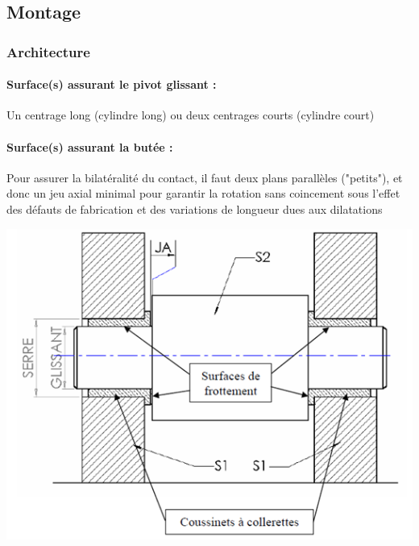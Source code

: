 \documentclass[11pt,oneside]{article}
\begin{document}

\subsection{Montage}
\subsubsection{Architecture}
\paragraph*{Surface(s) assurant le pivot glissant :}
Un centrage long (cylindre long) ou deux centrages courts (cylindre court)
\paragraph*{Surface(s) assurant la butée :}
Pour assurer la bilatéralité du contact, il faut deux plans parallèles ("petits"), et donc un jeu axial minimal pour garantir la rotation sans coincement sous l'effet des défauts de fabrication et des variations de longueur dues aux dilatations 

\begin{center}
\includegraphics[width=.75\textwidth]{png/fig19}
\end{center}
\end{document}
